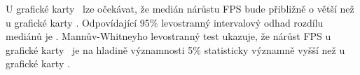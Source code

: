 \begin{enumerate}[label=\alph*)]
\begin{minipage}{0.94\textwidth}
        U grafické karty \nvidiaCard\ lze očekávat, že medián nárůstu FPS bude přibližně o \pointGuess větší než u grafické karty \amdCard.\@
        Odpovídající 95\% levostranný intervalový odhad rozdílu mediánů je \wilcoxLeftSidedInterval.\@
        Mannův-Whitneyho levostranný test ukazuje, že nárůst FPS u grafické karty \nvidiaCard\ je na hladině významnosti 5\% statisticky významně
        vyšší než u grafické karty \amdCard.\@
    \end{minipage}
\end{enumerate}

\endinput